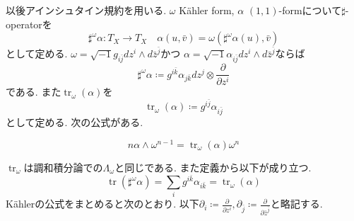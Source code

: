 \documentclass[dvipdfmx,a4paper,11pt]{article} %
\theoremstyle{definition}
\theoremstyle{remark}
\numberwithin{equation}{section}
\begin{document}
以後アインシュタイン規約を用いる. 
$\omega$ K\"ahler form, $\alpha$ $(1,1)$-formについて$\sharp$-operatorを
\[
\sharp^{\omega} \alpha  \colon T_X \to T_X \quad
\alpha(u, \bar{v})=\omega(\sharp^{\omega} \alpha(u), \bar{v})
\]
として定める. 
$\omega=\sqrt{-1}g_{i \bar{j}} dz^i \wedge d \bar{z}^{\bar{j}}$かつ
$\alpha = \sqrt{-1}\alpha_{i \bar{j}} dz^i \wedge d \bar{z}^{\bar{j}}$ならば
\[
\sharp^{\omega} \alpha
\coloneqq  g^{i \bar{k}}\alpha_{j \bar{k}}
dz^{j} \otimes \frac{\partial}{\partial z^i}
\]
である. 
また$\operatorname{tr}_{\omega}(\alpha)$を
\[
\operatorname{tr}_{\omega}(\alpha)\coloneqq  g^{i\bar{j}}\alpha_{i\bar{j}}
\]
として定める. 次の公式がある. 
\begin{tcolorbox}[mybox]
\[
n \alpha \wedge \omega^{n-1}
= \operatorname{tr}_{\omega}(\alpha) \omega^{n}
\]
\end{tcolorbox}
$\operatorname{tr}_{\omega}$は調和積分論での$\Lambda_{\omega}$と同じである. 
また定義から以下が成り立つ. 
\[
\operatorname{tr}(\sharp^{\omega} \alpha)
=\sum_{i}g^{i \bar{k}}\alpha_{i\bar{k}}
=\operatorname{tr}_{\omega}(\alpha)
\]
K\"ahlerの公式をまとめると次のとおり. 以下$\partial_{i}\coloneqq \frac{\partial}{\partial z^{i}}, \partial_{\bar j }\coloneqq \frac{\partial}{\partial \bar{z}^{\bar{j}}}$と略記する. 
\end{document}
